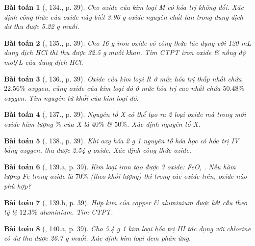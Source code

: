 \documentclass{article}
\newtheorem{baitoan}{Bài toán}
\begin{document}
\begin{baitoan}[\cite{An_400_BT_Hoa_Hoc_9}, 134., p. 39]
	Cho oxide {\rm{}} của kim loại M có hóa trị không đổi. Xác định công thức của oxide này biết {\rm3.96 g} oxide nguyên chất tan trong dung dịch {\rm{}} dư thu được {\rm5.22 g} muối.
\end{baitoan}

\begin{baitoan}[\cite{An_400_BT_Hoa_Hoc_9}, 135., p. 39]
	Cho {\rm16 g} iron oxide có công thức {\rm{}} tác dụng với {\rm120 mL} dung dịch {\rm HCl} thì thu được {\rm32.5 g} muối khan. Tìm {\rm CTPT} iron oxide \& nồng độ {\rm mol{\tt/}L} của dung dịch {\rm HCl}.
\end{baitoan}

\begin{baitoan}[\cite{An_400_BT_Hoa_Hoc_9}, 136., p. 39]
	Oxide của kim loại R ở mức hóa trị thấp nhất chứa $22.56\%$ oxygen, cũng oxide của kim loại đó ở mức hóa trị cao nhất chứa $50.48\%$ oxygen. Tìm nguyên tử khối của kim loại đó.
\end{baitoan}

\begin{baitoan}[\cite{An_400_BT_Hoa_Hoc_9}, 137., p. 39]
	Nguyên tố X có thể tạo ra 2 loại oxide mà trong mỗi oxide hàm lượng $\%$ của X là $40\%$ \& $50\%$. Xác định nguyên tố X.
\end{baitoan}

\begin{baitoan}[\cite{An_400_BT_Hoa_Hoc_9}, 138., p. 39]
	Khi oxy hóa {\rm2 g} 1 nguyên tố hóa học có hóa trị IV bằng oxygen, thu được {\rm2.54 g} oxide. Xác định công thức oxide.
\end{baitoan}

\begin{baitoan}[\cite{An_400_BT_Hoa_Hoc_9}, 139.a, p. 39]
	Kim loại iron tạo được 3 oxide: {\rm FeO, }. Nếu hàm lượng {\rm Fe} trong oxide là $70\%$ (theo khối lượng) thì trong các oxide trên, oxide nào phù hợp?
\end{baitoan}

\begin{baitoan}[\cite{An_400_BT_Hoa_Hoc_9}, 139.b, p. 39]
	Hợp kim của copper \& aluminium được kết cấu theo tỷ lệ $12.3\%$ aluminium. Tìm {\rm CTPT}.
\end{baitoan}

\begin{baitoan}[\cite{An_400_BT_Hoa_Hoc_9}, 140.a, p. 39]
	Cho {\rm5.4 g} 1 kim loại hóa trị III tác dụng với chlorine có dư thu được {\rm26.7 g} muối. Xác định kim loại đem phản ứng.
\end{baitoan}
\end{document}

